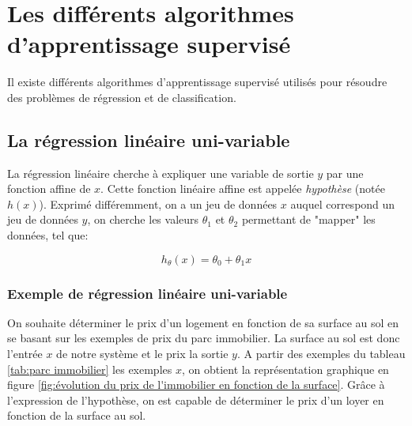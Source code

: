 \section{Les différents algorithmes d'apprentissage supervisé}
\label{Le Machine Learning:Les différents algorithmes d'apprentissage supervisé}
Il existe différents algorithmes d'apprentissage supervisé utilisés pour résoudre des problèmes de régression et de classification. 



\subsection{La régression linéaire uni-variable}
\label{Le Machine Learning:Les différents algorithmes d'apprentissage supervisé: La regression linéaire}
La régression linéaire cherche à expliquer une variable de sortie $y$ par une fonction affine de $x$. Cette fonction linéaire affine est appelée \emph{hypothèse} (notée $h(x)$). Exprimé différemment, on a un jeu de données $x$ auquel correspond un jeu de données $y$, on cherche les valeurs $\theta_1$ et $\theta_2$ permettant de "mapper" les données, tel que:

\begin{equation}
	h_\theta (x) = \theta_0 + \theta_1 x
\end{equation}


\subsubsection{Exemple de régression linéaire uni-variable}
\label{Le Machine Learning:Les différents algorithmes d'apprentissage supervisé: La regression linéaire: Exemple de régression linéaire uni-variable}
On souhaite déterminer le prix d'un logement en fonction de sa surface au sol en se basant sur les exemples de prix du parc immobilier. 
La surface au sol est donc l'entrée $x$ de notre système et le prix la sortie $y$. A partir des exemples du tableau \ref {tab:parc immobilier} les exemples $x$, on obtient la représentation graphique en figure \ref{fig:évolution du prix de l'immobilier en fonction de la surface}. Grâce à l'expression de l'hypothèse, on est capable de déterminer le prix d'un loyer en fonction de la surface au sol.  

